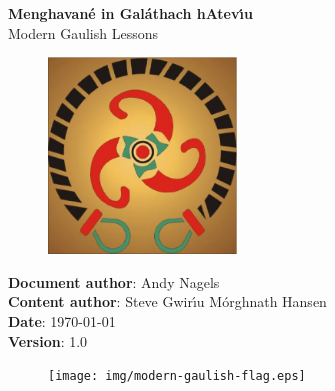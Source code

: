 \begin{titlepage}
  \thispagestyle{empty} %
  \vspace*{\fill}

  \begin{center}
    \textbf{\Huge Menghavan\'{e} in Gal\'{a}thach hAtev\'{\i}u}\\
    {\huge Modern Gaulish Lessons}\\
    
    \vspace{\fill}

    \begin{figure}[H]
    \centering
    \includegraphics[width=5.0cm]{img/modern-gaulish-logo.eps}
    \end{figure}

    \noindent \textbf{Document author}: Andy Nagels\\
    \noindent \textbf{Content author}: Steve Gwir\'{\i}u M\'{o}rghnath Hansen\\
    \noindent \textbf{Date}: \today\\
    \noindent \textbf{Version}: 1.0\\

    \begin{figure}[H]
    \centering
    \texttt{[image: img/modern-gaulish-flag.eps]}
    \end{figure}
    
    \vspace{\fill}

  \end{center}
  \vspace*{\fill}

\end{titlepage}
